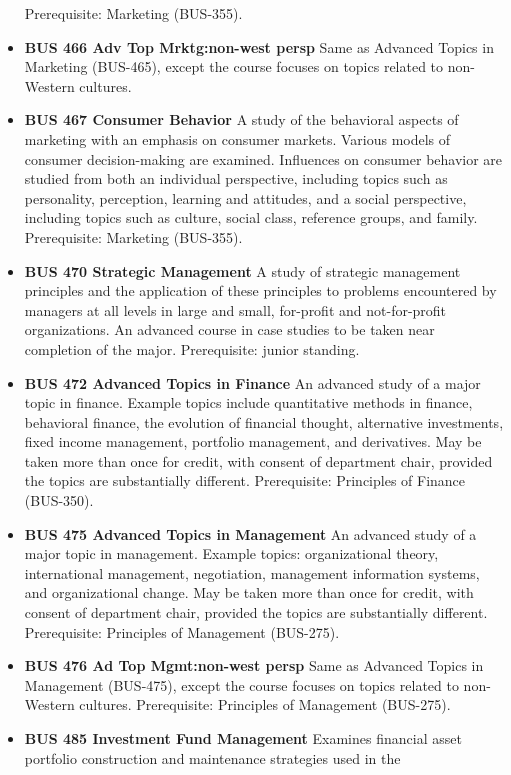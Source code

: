 \documentclass[
  letterpaper,
]{scrbook}
\begin{document}
\begin{itemize}
  Prerequisite: Marketing (BUS-355).
\item
  \textbf{BUS 466 Adv Top Mrktg:non-west persp} Same as Advanced Topics
  in Marketing (BUS-465), except the course focuses on topics related to
  non-Western cultures.
\item
  \textbf{BUS 467 Consumer Behavior} A study of the behavioral aspects
  of marketing with an emphasis on consumer markets. Various models of
  consumer decision-making are examined. Influences on consumer behavior
  are studied from both an individual perspective, including topics such
  as personality, perception, learning and attitudes, and a social
  perspective, including topics such as culture, social class, reference
  groups, and family. Prerequisite: Marketing (BUS-355).
\item
  \textbf{BUS 470 Strategic Management} A study of strategic management
  principles and the application of these principles to problems
  encountered by managers at all levels in large and small, for-profit
  and not-for-profit organizations. An advanced course in case studies
  to be taken near completion of the major. Prerequisite: junior
  standing.
\item
  \textbf{BUS 472 Advanced Topics in Finance} An advanced study of a
  major topic in finance. Example topics include quantitative methods in
  finance, behavioral finance, the evolution of financial thought,
  alternative investments, fixed income management, portfolio
  management, and derivatives. May be taken more than once for credit,
  with consent of department chair, provided the topics are
  substantially different. Prerequisite: Principles of Finance
  (BUS-350).
\item
  \textbf{BUS 475 Advanced Topics in Management} An advanced study of a
  major topic in management. Example topics: organizational theory,
  international management, negotiation, management information systems,
  and organizational change. May be taken more than once for credit,
  with consent of department chair, provided the topics are
  substantially different. Prerequisite: Principles of Management
  (BUS-275).
\item
  \textbf{BUS 476 Ad Top Mgmt:non-west persp} Same as Advanced Topics in
  Management (BUS-475), except the course focuses on topics related to
  non-Western cultures. Prerequisite: Principles of Management
  (BUS-275).
\item
  \textbf{BUS 485 Investment Fund Management} Examines financial asset
  portfolio construction and maintenance strategies used in the

\end{itemize}
\end{document}
